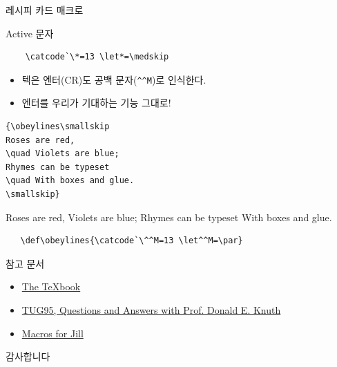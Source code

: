 \documentclass{beamer}
\begin{document}
%
\begin{frame}[standout]
  레시피 카드 매크로
\end{frame}


%
\begin{frame}[fragile]{Active 문자}
  \begin{Verbatim}
    \catcode`\*=13 \let*=\medskip
  \end{Verbatim}
\end{frame}


%
\begin{frame}[fragile]{\texttt{\string\obeylines}}
  \begin{itemize}
  \item 텍은 엔터(CR)도 공백 문자(\verb+^^M+)로 인식한다. %
  \item 엔터를 우리가 기대하는 기능 그대로! 
  \end{itemize}

  \begin{table}[ht]
  \begin{minipage}[t]{.4\textwidth}
  \begin{Verbatim}[fontsize=\small]
{\obeylines\smallskip
Roses are red,
\quad Violets are blue;
Rhymes can be typeset
\quad With boxes and glue.
\smallskip}
  \end{Verbatim}
  \end{minipage}%
  \qquad\qquad
  \begin{minipage}[t]{.4\linewidth}
    {\obeylines
      Roses are red,
      \quad Violets are blue;
      Rhymes can be typeset
      \quad With boxes and glue.
      \smallskip}
  \end{minipage}
  \end{table}
  
  \begin{Verbatim}
   \def\obeylines{\catcode`\^^M=13 \let^^M=\par}
  \end{Verbatim}
\end{frame}


%
\begin{frame}{참고 문서}
  \begin{itemize}
  \item \href{http://ftp.ktug.org/tex-archive/systems/knuth/dist/tex/}
    {The \TeX book}
  \item \href{https://tug.org/TUGboat/tb17-1/tb50knut.pdf}
    {TUG95, Questions and Answers with Prof. Donald E. Knuth}
  \item \href{https://www.tug.org/TUGboat/tb08-3/tb19knut.pdf}
    {Macros for Jill}
  \end{itemize}
\end{frame}


%
\begin{frame}[standout]
  감사합니다
\end{frame}
\end{document}
